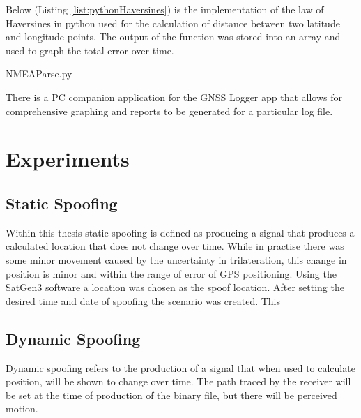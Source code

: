 Below (Listing \ref{list:pythonHaversines}) is the implementation of the law of Haversines in python used for the calculation of distance between two latitude and longitude points. The output of the function was stored
into an array and used to graph the total error over time.


\begin{lstinputlisting}[language=Python, label=list:pythonHaversines, caption=Python implementation of the law of Haversines used to calculate the distance between two points on a sphere, firstline=23, lastline=29]{NMEAParse.py}
\end{lstinputlisting}

There is a PC companion application for the GNSS Logger app that allows for comprehensive
graphing and reports to be generated for a particular log file.


\section{Experiments}
\subsection{Static Spoofing}
Within this thesis static spoofing is defined as producing a signal that produces a calculated location that does not change over time. While in practise there was some
minor movement caused by the uncertainty in trilateration, this change in position is minor and within the range of error of GPS positioning.
Using the SatGen3 software a location was chosen as the spoof location. After setting the desired time and date of spoofing the scenario was created. This 

\subsection{Dynamic Spoofing}
Dynamic spoofing refers to the production of a signal that when used to calculate position, will be shown to change over time. The path traced by the receiver will be
set at the time of production of the binary file, but there will be perceived motion.

